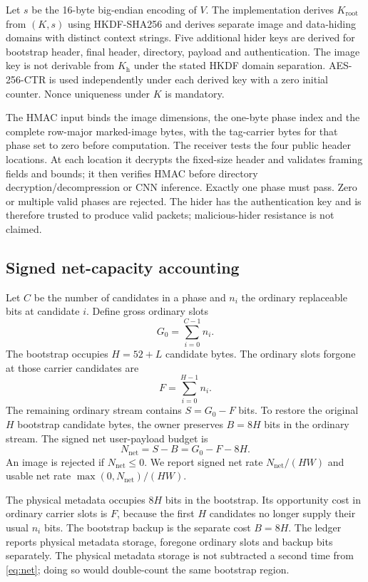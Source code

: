 \documentclass[preprint,12pt,a4paper]{elsarticle}
\newcommand{\Kh}{K_{\mathrm{h}}}
\begin{document}
Let $s$ be the 16-byte big-endian encoding of $V$. The implementation derives $K_{\mathrm{root}}$ from $(K,s)$ using HKDF-SHA256 and derives separate image and data-hiding domains with distinct context strings. Five additional hider keys are derived for bootstrap header, final header, directory, payload and authentication. The image key is not derivable from $\Kh$ under the stated HKDF domain separation. AES-256-CTR is used independently under each derived key with a zero initial counter. Nonce uniqueness under $K$ is mandatory.

The HMAC input binds the image dimensions, the one-byte phase index and the complete row-major marked-image bytes, with the tag-carrier bytes for that phase set to zero before computation. The receiver tests the four public header locations. At each location it decrypts the fixed-size header and validates framing fields and bounds; it then verifies HMAC before directory decryption/decompression or CNN inference. Exactly one phase must pass. Zero or multiple valid phases are rejected. The hider has the authentication key and is therefore trusted to produce valid packets; malicious-hider resistance is not claimed.

\subsection{Signed net-capacity accounting}

Let $C$ be the number of candidates in a phase and $n_i$ the ordinary replaceable bits at candidate $i$. Define gross ordinary slots
\begin{equation}
G_0=\sum_{i=0}^{C-1}n_i.
\end{equation}
The bootstrap occupies $H=52+L$ candidate bytes. The ordinary slots forgone at those carrier candidates are
\begin{equation}
F=\sum_{i=0}^{H-1}n_i.
\end{equation}
The remaining ordinary stream contains $S=G_0-F$ bits. To restore the original $H$ bootstrap candidate bytes, the owner preserves $B=8H$ bits in the ordinary stream. The signed net user-payload budget is
\begin{equation}
N_{\mathrm{net}}=S-B=G_0-F-8H.
\label{eq:net}
\end{equation}
An image is rejected if $N_{\mathrm{net}}\le0$. We report signed net rate $N_{\mathrm{net}}/(HW)$ and usable net rate $\max(0,N_{\mathrm{net}})/(HW)$.

The physical metadata occupies $8H$ bits in the bootstrap. Its opportunity cost in ordinary carrier slots is $F$, because the first $H$ candidates no longer supply their usual $n_i$ bits. The bootstrap backup is the separate cost $B=8H$. The ledger reports physical metadata storage, foregone ordinary slots and backup bits separately. The physical metadata storage is not subtracted a second time from \cref{eq:net}; doing so would double-count the same bootstrap region.
\end{document}
